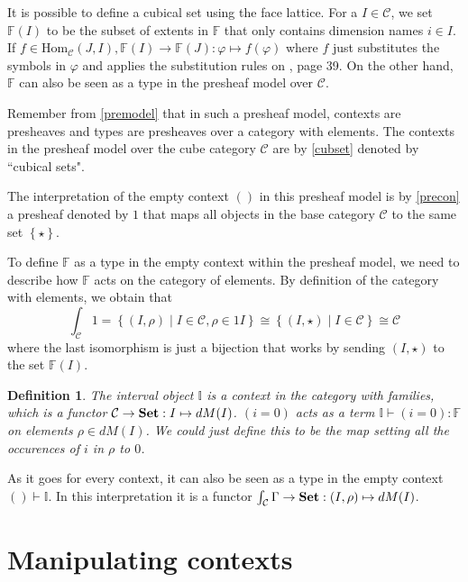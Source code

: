 \documentclass[11pt,a4paper,twoside,xetex,draft]{book}
\newcommand{\keyword}[1]{\emph{#1}\index{#1}}
\newtheorem{definition}[theorem]{Definition}
\newcommand{\singleton}[0]{\left\{ \star \right\}}
\newcommand{\homo}[3]{\text{Hom}_{#1}\left(#2,#3\right)}
\begin{document}
It is possible to define a cubical set using the face lattice. For a $I\in \mathcal{C}$, we set $\mathbb{F}(I)$ to be the subset of extents in $\mathbb{F}$ that only contains dimension names $i \in I$. If $f \in \homo{\mathcal{C}}{J}{I}, \mathbb{F}(I) \rightarrow \mathbb{F}(J): \varphi \mapsto f(\varphi)$ where $f$ just substitutes the symbols in $\varphi$ and applies the substitution rules on \cite{Orton2019}, page 39. On the other hand, $\mathbb{F}$ can also be seen as a type in the presheaf model over $\mathcal{C}$. 

Remember from \cref{premodel} that in such a presheaf model, contexts are presheaves and types are presheaves over a category with elements. The contexts in the presheaf model over the cube category $\mathcal{C}$ are by \cref{cubset} denoted by ``cubical sets".

The interpretation of the empty context $()$ in this presheaf model is by \cref{precon} a presheaf denoted by $1$ that maps all objects in the base category $\mathcal{C}$ to the same set $\singleton$. 

To define $\mathbb{F}$ as a type in the empty context within the presheaf model, we need to describe how $\mathbb{F}$ acts on the category of elements. By definition of the category with elements, we obtain that $$\int_{\mathcal{C}} 1 = \left\{ (I, \rho ) \mid I \in \mathcal{C}, \rho \in 1I \right\} \cong \left\{ (I, \star ) \mid I \in \mathcal{C} \right\}  \cong \mathcal{C}$$ where the last isomorphism is just a bijection that works by sending $(I, \star )$ to the set $\mathbb{F}(I)$.


\begin{definition}\label{interval}
The \keyword{interval object} $\mathbb{I}$ is a context in the category with families, which is a functor $\mathcal{C} \rightarrow \text{\textbf{Set}} : I \mapsto dM(I)$. $(i=0)$ acts as a term $\mathbb{I} \vdash (i = 0) : \mathbb{F}$ on elements $\rho \in dM (I)$. We could just define this to be the map setting all the occurences of $i$ in $\rho$ to $0$.
\end{definition}

As it goes for every context, it can also be seen as a type in the empty context $() \vdash \mathbb{I}$. 
In this interpretation it is a functor  $\int_{\mathcal{C}} \Gamma \rightarrow \text{\textbf{Set}} : (I,\rho) \mapsto dM(I)$.



\section{Manipulating contexts}
\end{document}
